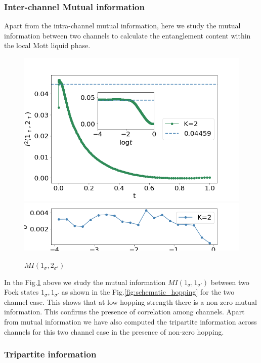 \documentclass[reprint,prb,superscriptaddress]{revtex4-2}
\begin{document}
\subsubsection{Inter-channel Mutual information}
Apart from the intra-channel mutual information, here we study the mutual information between two channels to calculate the entanglement content within the local Mott liquid phase.
\begin{figure}
\includegraphics[scale=0.4]{plt/A_I2_ch2_[1,3]}
\includegraphics[scale=0.4]{plt/errorbar_A_I2_ch2_[1,3]}
\caption{$MI(1_{\sigma},2_{\sigma'})$}
\label{fig:MI_1_2}
\end{figure}
In the Fig.\ref{fig:MI_1_2} above we study the mutual information $MI(1_{\sigma},1_{\sigma'})$ between two Fock states $1_{\sigma},1_{\sigma'}$ as shown in the Fig.\ref{fig:schematic_hopping} for the two channel case. This shows that at low hopping strength there is a non-zero mutual information. This confirms the presence of correlation among channels. Apart from mutual information we have also computed the tripartite information across channels for this two channel case in the presence of non-zero hopping.
\subsubsection{Tripartite information}
\end{document}
